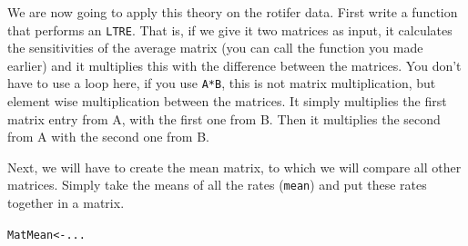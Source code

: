 \documentclass{article}\usepackage[]{graphicx}\usepackage[]{color}
\makeatletter
\newcommand{\hlstd}[1]{\textcolor[rgb]{0.345,0.345,0.345}{#1}}%
\newcommand{\hlkwb}[1]{\textcolor[rgb]{0.69,0.353,0.396}{#1}}%
\newenvironment{kframe}{%
 \def\at@end@of@kframe{}%
 \ifinner\ifhmode%
  \def\at@end@of@kframe{\end{minipage}}%
  \begin{minipage}{\columnwidth}%
 \fi\fi%
 \def\FrameCommand##1{\hskip\@totalleftmargin \hskip-\fboxsep
 \colorbox{shadecolor}{##1}\hskip-\fboxsep
     \hskip-\linewidth \hskip-\@totalleftmargin \hskip\columnwidth}%
 \MakeFramed {\advance\hsize-\width
   \@totalleftmargin\z@ \linewidth\hsize
   \@setminipage}}%
 {\par\unskip\endMakeFramed%
 \at@end@of@kframe}
\newenvironment{knitrout}{}{} %
\makeatother
\begin{document}
We are now going to apply this theory on the rotifer data. First write a function that performs an \texttt{LTRE}. That is, if we give it two matrices as input, it calculates the sensitivities of the average matrix (you can call the function you made earlier) and it multiplies this with the difference between the matrices. You don't have to use a loop here, if you use \texttt{A*B}, this is not matrix multiplication, but element wise multiplication between the matrices. It simply multiplies the first matrix entry from A, with the first one from B. Then it multiplies the second from A with the second one from B.

Next, we will have to create the mean matrix, to which we will compare all other matrices. Simply take the means of all the rates (\texttt{mean}) and put these rates together in a matrix.
\begin{knitrout}
\color{fgcolor}\begin{kframe}
\begin{alltt}
\hlstd{MatMean} \hlkwb{<-} \hlstd{...}
\end{alltt}
\end{kframe}
\end{knitrout}
\end{document}
